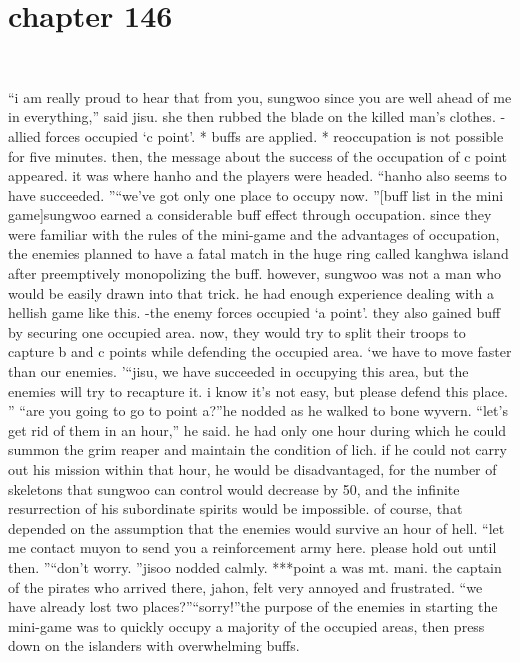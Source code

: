 \section{chapter 146}

                             




“i am really proud to hear that from you, sungwoo since you are well ahead of me in everything,” said jisu.
she then rubbed the blade on the killed man’s clothes.
-allied forces occupied ‘c point’.
* buffs are applied.
* reoccupation is not possible for five minutes.
then, the message about the success of the occupation of c point appeared.
 it was where hanho and the players were headed.
“hanho also seems to have succeeded.
”“we’ve got only one place to occupy now.
”[buff list in the mini game]sungwoo earned a considerable buff effect through occupation.
 since they were familiar with the rules of the mini-game and the advantages of occupation, the enemies planned to have a fatal match in the huge ring called kanghwa island after preemptively monopolizing the buff.
however, sungwoo was not a man who would be easily drawn into that trick.
 he had enough experience dealing with a hellish game like this.
-the enemy forces occupied ‘a point’.
they also gained buff by securing one occupied area.
 now, they would try to split their troops to capture b and c points while defending the occupied area.
‘we have to move faster than our enemies.
’“jisu, we have succeeded in occupying this area, but the enemies will try to recapture it.
 i know it’s not easy, but please defend this place.
”
“are you going to go to point a?”he nodded as he walked to bone wyvern.
“let’s get rid of them in an hour,” he said.
he had only one hour during which he could summon the grim reaper and maintain the condition of lich.
 if he could not carry out his mission within that hour, he would be disadvantaged, for the number of skeletons that sungwoo can control would decrease by 50, and the infinite resurrection of his subordinate spirits would be impossible.
 of course, that depended on the assumption that the enemies would survive an hour of hell.
“let me contact muyon to send you a reinforcement army here.
 please hold out until then.
”“don’t worry.
”jisoo nodded calmly.
***point a was mt.
 mani.
 the captain of the pirates who arrived there, jahon, felt very annoyed and frustrated.
“we have already lost two places?”“sorry!”the purpose of the enemies in starting the mini-game was to quickly occupy a majority of the occupied areas, then press down on the islanders with overwhelming buffs.
